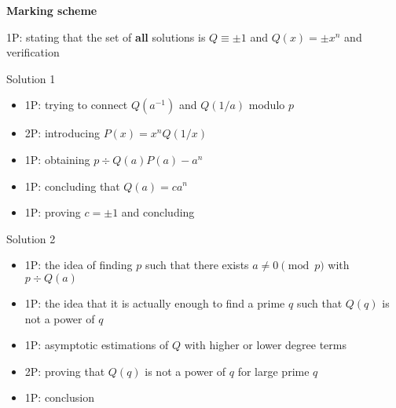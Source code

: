 \newpage 

\textbf{Marking scheme}

1P: stating that the set of \textbf{all} solutions is $Q\equiv \pm 1$ and $Q(x)=\pm x^n$ and verification 

Solution 1
\begin{itemize}
    \item 1P: trying to connect $Q(a^{-1})$ and $Q(1/a)$ modulo $p$
    \item 2P: introducing $P(x)=x^nQ(1/x)$
    \item 1P: obtaining $p\div Q(a)P(a)-a^n$
    \item 1P: concluding that $Q(a)=ca^n$
    \item 1P: proving $c=\pm 1$ and concluding
\end{itemize}

Solution 2
\begin{itemize}
    \item 1P: the idea of finding $p$ such that there exists $a\neq 0 \pmod p$ with $p\div Q(a)$
    \item 1P: the idea that it is actually enough to find a prime $q$ such that $Q(q)$ is not a power of $q$
    \item 1P: asymptotic estimations of $Q$ with higher or lower degree terms
    \item 2P: proving that $Q(q)$ is not a power of $q$ for large prime $q$
    \item 1P: conclusion
\end{itemize}


